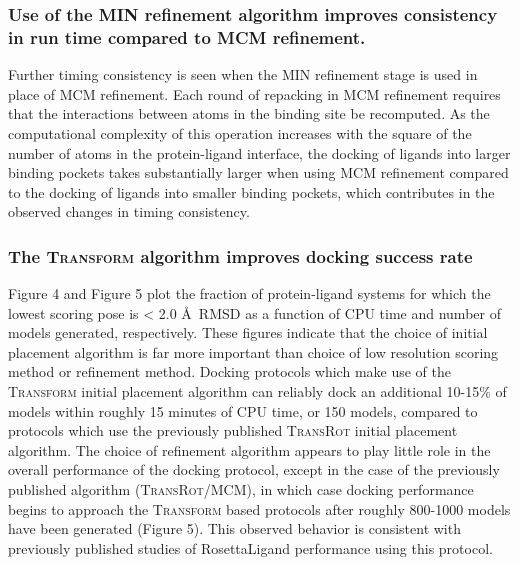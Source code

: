 \subsubsection{Use of the MIN refinement algorithm improves consistency in run time compared to MCM refinement.} 
Further timing consistency is seen when the MIN refinement stage is used in place of MCM refinement.
Each round of repacking in MCM refinement requires that the interactions between atoms in the binding site be recomputed.
As the computational complexity of this operation increases with the square of the number of atoms in the protein-ligand interface, the docking of ligands into larger binding pockets takes substantially larger when using MCM refinement compared to the docking of ligands into smaller binding pockets, which contributes in the observed changes in timing consistency.

\subsubsection{The \textsc{Transform} algorithm improves docking success rate}
Figure 4 and Figure 5 plot the fraction of protein-ligand systems for which the lowest scoring pose is < 2.0 \AA\ RMSD as a function of CPU time and number of models generated, respectively.
These figures indicate that the choice of initial placement algorithm is far more important than choice of low resolution scoring method or refinement method.
Docking protocols which make use of the \textsc{Transform} initial placement algorithm can reliably dock an additional 10-15\% of models within roughly 15 minutes of CPU time, or 150 models, compared to protocols which use the previously published \textsc{TransRot} initial placement algorithm.
The choice of refinement algorithm appears to play little role in the overall performance of the docking protocol, except in the case of the previously published algorithm (\textsc{TransRot}/MCM), in which case docking performance begins to approach the \textsc{Transform} based protocols after roughly 800-1000 models have been generated (Figure 5).
This observed behavior is consistent with previously published studies of RosettaLigand performance using this protocol\citep{Davis:2009fx,Combs:2013bl,Lemmon:2012ku}. 

